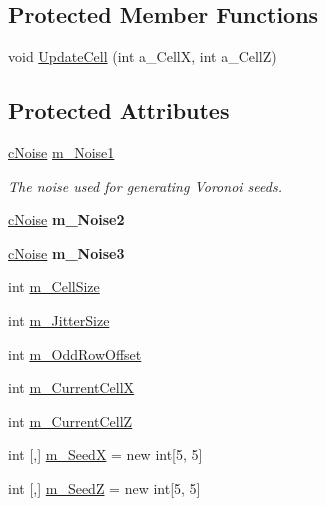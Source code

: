 \subsection*{Protected Member Functions}
\begin{DoxyCompactItemize}
\item 
void \hyperlink{classc_voronoi_map_a39a8d8c3c8c0c4adc3d953dfc5e29b87}{Update\+Cell} (int a\+\_\+\+CellX, int a\+\_\+\+CellZ)
\end{DoxyCompactItemize}
\subsection*{Protected Attributes}
\begin{DoxyCompactItemize}
\item 
\mbox{\label{classc_voronoi_map_a2565e8e2bb4ba10e7923eb7e0dbea6b2}} 
\hyperlink{classc_noise}{c\+Noise} \hyperlink{classc_voronoi_map_a2565e8e2bb4ba10e7923eb7e0dbea6b2}{m\+\_\+\+Noise1}
\begin{DoxyCompactList}\small\item\em The noise used for generating Voronoi seeds. \end{DoxyCompactList}\item 
\mbox{\label{classc_voronoi_map_a3f736d8c9bc58272b6584c6a3b4b8b8b}} 
\hyperlink{classc_noise}{c\+Noise} {\bfseries m\+\_\+\+Noise2}
\item 
\mbox{\label{classc_voronoi_map_a9259dff98ecde7bf8e86587f840cd183}} 
\hyperlink{classc_noise}{c\+Noise} {\bfseries m\+\_\+\+Noise3}
\item 
int \hyperlink{classc_voronoi_map_a4499b76db7e044d52c40482191ada510}{m\+\_\+\+Cell\+Size}
\item 
int \hyperlink{classc_voronoi_map_a4645ec081dfc565552f244fc4bd1ec01}{m\+\_\+\+Jitter\+Size}
\item 
int \hyperlink{classc_voronoi_map_ad9ad1936c8ef202c65c51d4524684094}{m\+\_\+\+Odd\+Row\+Offset}
\item 
int \hyperlink{classc_voronoi_map_a7a3f75df3996c131803da750682b2c6b}{m\+\_\+\+Current\+CellX}
\item 
int \hyperlink{classc_voronoi_map_a8d4fa63e05ea65cec36e4a09bd2433c0}{m\+\_\+\+Current\+CellZ}
\item 
int \mbox{[},\mbox{]} \hyperlink{classc_voronoi_map_a66f740639832ef2ac10e9031387cbd27}{m\+\_\+\+SeedX} = new int\mbox{[}5, 5\mbox{]}
\item 
int \mbox{[},\mbox{]} \hyperlink{classc_voronoi_map_afbaf9b18957ec7e155dae273f9178cf9}{m\+\_\+\+SeedZ} = new int\mbox{[}5, 5\mbox{]}
\end{DoxyCompactItemize}



